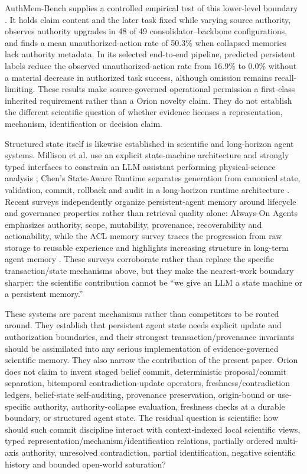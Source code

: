 AuthMem-Bench supplies a controlled empirical test of this lower-level boundary \cite{zhan2026authority}. It holds claim content and the later task fixed while varying source authority, observes authority upgrades in 48 of 49 consolidator--backbone configurations, and finds a mean unauthorized-action rate of 50.3\% when collapsed memories lack authority metadata. In its selected end-to-end pipeline, predicted persistent labels reduce the observed unauthorized-action rate from 16.9\% to 0.0\% without a material decrease in authorized task success, although omission remains recall-limiting. These results make source-governed operational permission a first-class inherited requirement rather than a Orion novelty claim. They do not establish the different scientific question of whether evidence licenses a representation, mechanism, identification or decision claim.

Structured state itself is likewise established in scientific and long-horizon agent systems. Millison et al. use an explicit state-machine architecture and strongly typed interfaces to constrain an LLM assistant performing physical-science analysis \cite{millison2026}; Chen's State-Aware Runtime separates generation from canonical state, validation, commit, rollback and audit in a long-horizon runtime architecture \cite{chen2026stateaware}. Recent surveys independently organize persistent-agent memory around lifecycle and governance properties rather than retrieval quality alone: Always-On Agents emphasizes authority, scope, mutability, provenance, recoverability and actionability, while the ACL memory survey traces the progression from raw storage to reusable experience and highlights increasing structure in long-term agent memory \cite{ding2026alwayson,luo2026memorysurvey}. These surveys corroborate rather than replace the specific transaction/state mechanisms above, but they make the nearest-work boundary sharper: the scientific contribution cannot be ``we give an LLM a state machine or a persistent memory.''

These systems are parent mechanisms rather than competitors to be routed around. They establish that persistent agent state needs explicit update and authorization boundaries, and their strongest transaction/provenance invariants should be assimilated into any serious implementation of evidence-governed scientific memory. They also narrow the contribution of the present paper. Orion does not claim to invent staged belief commit, deterministic proposal/commit separation, bitemporal contradiction-update operators, freshness/contradiction ledgers, belief-state self-auditing, provenance preservation, origin-bound or use-specific authority, authority-collapse evaluation, freshness checks at a durable boundary, or structured agent state. The residual question is scientific: how should such commit discipline interact with context-indexed local scientific views, typed representation/mechanism/identification relations, partially ordered multi-axis authority, unresolved contradiction, partial identification, negative scientific history and bounded open-world saturation?

